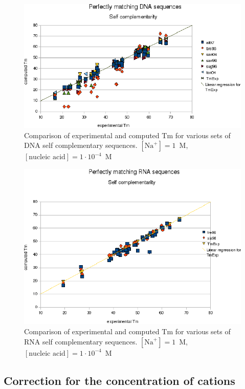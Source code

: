 \documentclass{article}
\begin{document}
\begin{figure}[h]
\includegraphics[width=1\linewidth]{images/DNASelfComplementarity}
\caption{Comparison of experimental and computed Tm for various sets of
 DNA self complementary sequences. $[\mbox{Na}^+] = 1$~M, $[\mbox{nucleic acid}] = 1\cdot{}10^{-4}$~M}
\end{figure} 

\begin{figure}[h]
\includegraphics[width=1\linewidth]{images/RNASelfComplementarity}
\caption{Comparison of experimental and computed Tm for various sets of
 RNA self complementary sequences. $[\mbox{Na}^+] = 1$~M, $[\mbox{nucleic acid}] = 1\cdot{}10^{-4}$~M}
\end{figure}     
  
\clearpage
\subsection{Correction for the concentration of cations}  
\end{document}
